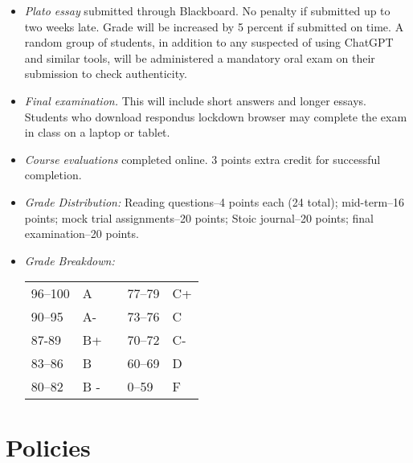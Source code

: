 \documentclass[article,oneside]{memoir}
\begin{document}
\begin{itemize}
\item \textit{Plato essay} submitted through Blackboard. No penalty if submitted up to two weeks late. Grade will be increased by 5 percent if submitted on time. A random group of students, in addition to any suspected of using ChatGPT and similar tools, will be administered a mandatory oral exam on their submission to check authenticity. 

\item \textit{Final examination.} This will include short answers and longer essays. Students who download respondus lockdown browser may complete the exam in class on a laptop or tablet. 


\item \textit{Course evaluations} completed online. 3 points extra credit for successful completion.

\item \textit{Grade Distribution:} Reading questions--4 points each (24 total); mid-term--16 points; mock trial assignments--20 points; Stoic journal--20 points; final examination--20 points.



\item \textit{Grade Breakdown:}

 \begin{tabular}{ | l | l | p{2cm} | l | l | }
    \hline 
96--100 & A  & &  77--79 &  C+ \\  
90--95 & A- & &  73--76 & C \\
87-89 & B+ &  &  70--72 & C- \\ 
83--86 & B  & &  60--69 & D\\
80--82 & B - & & 0--59 & F\\ \hline
    \end{tabular}


\end{itemize}





\section{Policies}
\end{document}
